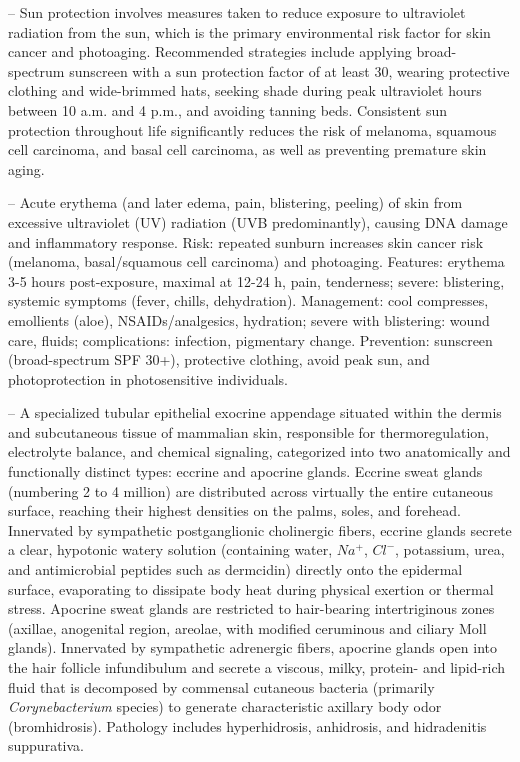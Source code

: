 -- Sun protection involves measures taken to reduce exposure to ultraviolet radiation from the sun, which is the primary environmental risk factor for skin cancer and photoaging. Recommended strategies include applying broad-spectrum sunscreen with a sun protection factor of at least 30, wearing protective clothing and wide-brimmed hats, seeking shade during peak ultraviolet hours between 10 a.m. and 4 p.m., and avoiding tanning beds. Consistent sun protection throughout life significantly reduces the risk of melanoma, squamous cell carcinoma, and basal cell carcinoma, as well as preventing premature skin aging.

-- Acute erythema (and later edema, pain, blistering, peeling) of skin from excessive ultraviolet (UV) radiation (UVB predominantly), causing DNA damage and inflammatory response. Risk: repeated sunburn increases skin cancer risk (melanoma, basal/squamous cell carcinoma) and photoaging. Features: erythema 3-5 hours post-exposure, maximal at 12-24 h, pain, tenderness; severe: blistering, systemic symptoms (fever, chills, dehydration). Management: cool compresses, emollients (aloe), NSAIDs/analgesics, hydration; severe with blistering: wound care, fluids; complications: infection, pigmentary change. Prevention: sunscreen (broad-spectrum SPF 30+), protective clothing, avoid peak sun, and photoprotection in photosensitive individuals.

-- A specialized tubular epithelial exocrine appendage situated within the dermis and subcutaneous tissue of mammalian skin, responsible for thermoregulation, electrolyte balance, and chemical signaling, categorized into two anatomically and functionally distinct types: eccrine and apocrine glands. Eccrine sweat glands (numbering 2 to 4 million) are distributed across virtually the entire cutaneous surface, reaching their highest densities on the palms, soles, and forehead. Innervated by sympathetic postganglionic cholinergic fibers, eccrine glands secrete a clear, hypotonic watery solution (containing water, $Na^+$, $Cl^-$, potassium, urea, and antimicrobial peptides such as dermcidin) directly onto the epidermal surface, evaporating to dissipate body heat during physical exertion or thermal stress. Apocrine sweat glands are restricted to hair-bearing intertriginous zones (axillae, anogenital region, areolae, with modified ceruminous and ciliary Moll glands). Innervated by sympathetic adrenergic fibers, apocrine glands open into the hair follicle infundibulum and secrete a viscous, milky, protein- and lipid-rich fluid that is decomposed by commensal cutaneous bacteria (primarily \textit{Corynebacterium} species) to generate characteristic axillary body odor (bromhidrosis). Pathology includes hyperhidrosis, anhidrosis, and hidradenitis suppurativa.

